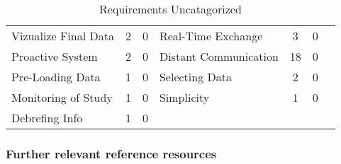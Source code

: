 \begin{table}[htbp]
\begin{tabular}{lcclccc}
        Vizualize Final Data                                       & 2                          & 0                         & Real-Time Exchange                                         & 3                          & 0                         \\
        Proactive System                                           & 2                          & 0                         & Distant Communication                                      & 18                         & 0                         \\
        Pre-Loading Data                                           & 1                          & 0                         & Selecting Data                                              & 2                          & 0                         \\
        Monitoring of Study                                        & 1                          & 0                         & Simplicity                                                  & 1                          & 0                         \\
        Debrefing Info                                             & 1                          & 0                         & & & & \\\hline
        \end{tabular}
        \caption[Requirements Uncatagorized]{Requirements Uncatagorized}\label{tab:requirementsRaw1}
        \end{table}


  \subsubsection{Further relevant reference resources}\label{subsec:furtherRequirements}


